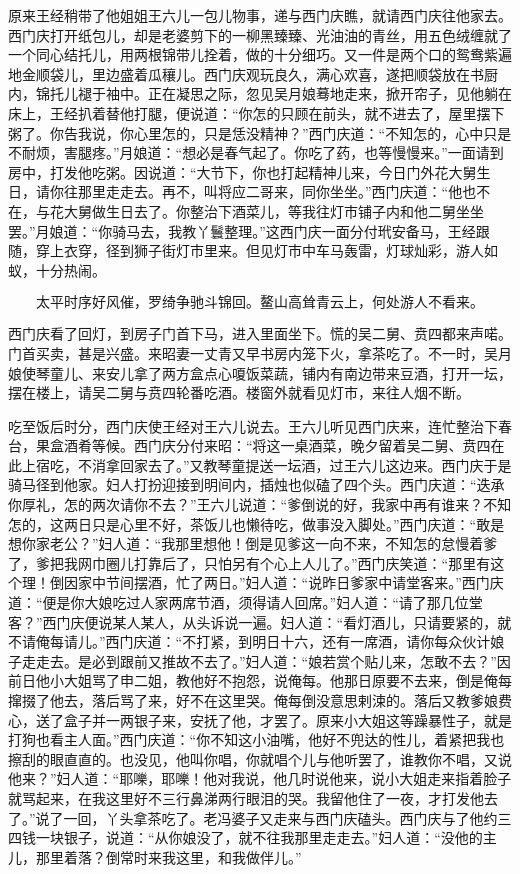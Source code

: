 原来王经稍带了他姐姐王六儿一包儿物事，递与西门庆瞧，就请西门庆往他家去。西门庆打开纸包儿，却是老婆剪下的一柳黑臻臻、光油油的青丝，用五色绒缠就了一个同心结托儿，用两根锦带儿拴着，做的十分细巧。又一件是两个口的鸳鸯紫遍地金顺袋儿，里边盛着瓜穰儿。西门庆观玩良久，满心欢喜，遂把顺袋放在书厨内，锦托儿褪于袖中。正在凝思之际，忽见吴月娘蓦地走来，掀开帘子，见他躺在床上，王经扒着替他打腿，便说道：“你怎的只顾在前头，就不进去了，屋里摆下粥了。你告我说，你心里怎的，只是恁没精神？”西门庆道：“不知怎的，心中只是不耐烦，害腿疼。”月娘道：“想必是春气起了。你吃了药，也等慢慢来。”一面请到房中，打发他吃粥。因说道：“大节下，你也打起精神儿来，今日门外花大舅生日，请你往那里走走去。再不，叫将应二哥来，同你坐坐。”西门庆道：“他也不在，与花大舅做生日去了。你整治下酒菜儿，等我往灯市铺子内和他二舅坐坐罢。”月娘道：“你骑马去，我教丫鬟整理。”这西门庆一面分付玳安备马，王经跟随，穿上衣穿，径到狮子街灯市里来。但见灯市中车马轰雷，灯球灿彩，游人如蚁，十分热闹。

\[
太平时序好风催，罗绮争驰斗锦回。
鳌山高耸青云上，何处游人不看来。
\]

西门庆看了回灯，到房子门首下马，进入里面坐下。慌的吴二舅、贲四都来声喏。门首买卖，甚是兴盛。来昭妻一丈青又早书房内笼下火，拿茶吃了。不一时，吴月娘使琴童儿、来安儿拿了两方盒点心嗄饭菜蔬，铺内有南边带来豆酒，打开一坛，摆在楼上，请吴二舅与贲四轮番吃酒。楼窗外就看见灯市，来往人烟不断。

吃至饭后时分，西门庆使王经对王六儿说去。王六儿听见西门庆来，连忙整治下春台，果盒酒肴等候。西门庆分付来昭：“将这一桌酒菜，晚夕留着吴二舅、贲四在此上宿吃，不消拿回家去了。”又教琴童提送一坛酒，过王六儿这边来。西门庆于是骑马径到他家。妇人打扮迎接到明间内，插烛也似磕了四个头。西门庆道：“迭承你厚礼，怎的两次请你不去？”王六儿说道：“爹倒说的好，我家中再有谁来？不知怎的，这两日只是心里不好，茶饭儿也懒待吃，做事没入脚处。”西门庆道：“敢是想你家老公？”妇人道：“我那里想他！倒是见爹这一向不来，不知怎的怠慢着爹了，爹把我网巾圈儿打靠后了，只怕另有个心上人儿了。”西门庆笑道：“那里有这个理！倒因家中节间摆酒，忙了两日。”妇人道：“说昨日爹家中请堂客来。”西门庆道：“便是你大娘吃过人家两席节酒，须得请人回席。”妇人道：“请了那几位堂客？”西门庆便说某人某人，从头诉说一遍。妇人道：“看灯酒儿，只请要紧的，就不请俺每请儿。”西门庆道：“不打紧，到明日十六，还有一席酒，请你每众伙计娘子走走去。是必到跟前又推故不去了。”妇人道：“娘若赏个贴儿来，怎敢不去？”因前日他小大姐骂了申二姐，教他好不抱怨，说俺每。他那日原要不去来，倒是俺每撺掇了他去，落后骂了来，好不在这里哭。俺每倒没意思剌涑的。落后又教爹娘费心，送了盒子并一两银子来，安抚了他，才罢了。原来小大姐这等躁暴性子，就是打狗也看主人面。”西门庆道：“你不知这小油嘴，他好不兜达的性儿，着紧把我也擦刮的眼直直的。也没见，他叫你唱，你就唱个儿与他听罢了，谁教你不唱，又说他来？”妇人道：“耶嚛，耶嚛！他对我说，他几时说他来，说小大姐走来指着脸子就骂起来，在我这里好不三行鼻涕两行眼泪的哭。我留他住了一夜，才打发他去了。”说了一回，丫头拿茶吃了。老冯婆子又走来与西门庆磕头。西门庆与了他约三四钱一块银子，说道：“从你娘没了，就不往我那里走走去。”妇人道：“没他的主儿，那里着落？倒常时来我这里，和我做伴儿。”

